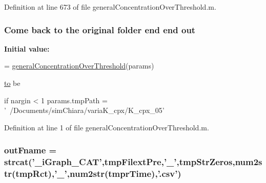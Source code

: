 Definition at line 673 of file general\-Concentration\-Over\-Threshold.\-m.

\hypertarget{a00022_a34c820385e9209f49c18739329ad9206}{
\subsubsection[{out}]{\setlength{\rightskip}{0pt plus 5cm}Come back {\bf to} the original folder {\bf end} {\bf end} out}}\label{a00022_a34c820385e9209f49c18739329ad9206}
{\bfseries Initial value\-:}
\begin{DoxyCode}
= \hyperlink{a00026_a56bd5c817530f9b305b5375d6509978a}{generalConcentrationOverThreshold}(params)

      \hyperlink{a00022_af71dbe52628a3f83a77ab494817525c6}{to} be 

\textcolor{keywordflow}{if} nargin < 1
    params.tmpPath = \textcolor{stringliteral}{'~/Documents/simChiara/variaK\_cpx/K\_cpx\_05'}
\end{DoxyCode}


Definition at line 1 of file general\-Concentration\-Over\-Threshold.\-m.

\hypertarget{a00022_abf4ae8c34e865742e8ee979ed6e03384}{
\subsubsection[{out\-Fname}]{\setlength{\rightskip}{0pt plus 5cm}out\-Fname = strcat('\-\_\-i\-Graph\-\_\-\-C\-A\-T',tmp\-Filext\-Pre,'\-\_\-',{\bf tmp\-Str\-Zeros},num2str(tmp\-Rct),'\-\_\-',num2str(tmpr\-Time),'.csv')}}\label{a00022_abf4ae8c34e865742e8ee979ed6e03384}


